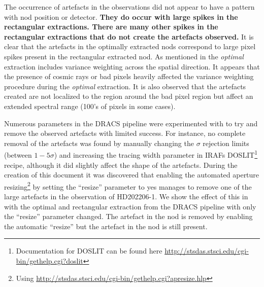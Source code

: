 The occurrence of artefacts in the observations did not appear to have a pattern with nod position or detector. \textbf{They do occur with large spikes in the rectangular extractions. There are many other spikes in the rectangular extractions that do not create the artefacts observed.
}
It is clear that the artefacts in the optimally extracted nods correspond to large pixel spikes present in the rectangular extracted nod. As mentioned in  the \emph{optimal} extraction includes variance weighting across the spatial direction. It appears that the presence of cosmic rays or bad pixels heavily affected the variance weighting procedure during the \emph{optimal} extraction. It is also observed that the artefacts created are not localized to the region around the bad pixel region but affect an extended spectral range (100's of pixels in some cases).

Numerous parameters in the {DRACS} pipeline were experimented with to try and remove the observed artefacts with limited success. For instance, no complete removal of the artefacts was found by manually changing the \(\sigma\) rejection limits (between \(1-5 \sigma\)) and increasing the tracing width parameter in {IRAF}s DOSLIT\footnote{Documentation for DOSLIT can be found here \href{http://stsdas.stsci.edu/cgi-bin/gethelp.cgi?doslit}{http://stsdas.stsci.edu/cgi-bin/gethelp.cgi?doslit}} recipe, although it did slightly affect the shape of the artefacts.
During the creation of this document it was discovered that enabling the automated aperture resizing\footnote{Using \href{apresize}{http://stsdas.stsci.edu/cgi-bin/gethelp.cgi?apresize.hlp}} by setting the ``resize'' parameter to yes manages to remove one of the large artefacts in the observation of {HD202206-1}. We show the effect of this in  with the optimal and rectangular extraction from the {DRACS} pipeline with only the ``resize'' parameter changed. The artefact in the  nod is removed by enabling the automatic ``resize'' but the artefact in the  nod is still present.

